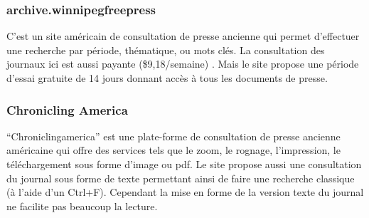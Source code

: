         \subsubsection{archive.winnipegfreepress}
        \label{subsubsec:winnipeg}
        C’est un site américain de consultation de presse ancienne qui permet d’effectuer une recherche par période,
        thématique, ou mots clés. La consultation des journaux ici  est aussi payante
        (\$9,18/semaine) . Mais le site propose une période d’essai gratuite de 14 jours donnant accès à tous les documents de presse.

        \subsubsection{Chronicling America}
        \label{subsubsec:chrinamerica}
        “Chroniclingamerica” est une plate-forme de consultation de presse ancienne américaine qui offre des services
        tels que le zoom, le rognage, l’impression, le téléchargement sous forme d’image ou pdf. Le site propose
        aussi une consultation du journal sous forme de texte permettant ainsi de faire une recherche classique
        (à l’aide d’un Ctrl+F). Cependant la mise en forme de la version texte du journal ne facilite pas beaucoup la lecture.

